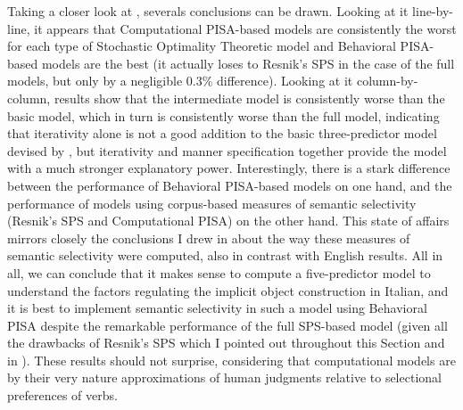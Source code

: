 Taking a closer look at , severals conclusions can be drawn. Looking at it line-by-line, it appears that Computational PISA-based models are consistently the worst for each type of Stochastic Optimality Theoretic model and Behavioral PISA-based models are the best (it actually loses to Resnik's SPS in the case of the full models, but only by a negligible 0.3\% difference). Looking at it column-by-column, results show that the intermediate model is consistently worse than the basic model, which in turn is consistently worse than the full model, indicating that iterativity alone is not a good addition to the basic three-predictor model devised by \textcite{Medina2007}, but iterativity and manner specification together provide the model with a much stronger explanatory power. Interestingly, there is a stark difference between the performance of Behavioral PISA-based models on one hand, and the performance of models using corpus-based measures of semantic selectivity (Resnik's SPS and Computational PISA) on the other hand. This state of affairs mirrors closely the conclusions I drew in  about the way these measures of semantic selectivity were computed, also in contrast with English results. All in all, we can conclude that it makes sense to compute a five-predictor model to understand the factors regulating the implicit object construction in Italian, and it is best to implement semantic selectivity in such a model using Behavioral PISA despite the remarkable performance of the full SPS-based model (given all the drawbacks of Resnik's SPS which I pointed out throughout this Section and in ). These results should not surprise, considering that computational models are by their very nature approximations of human judgments relative to selectional preferences of verbs.


